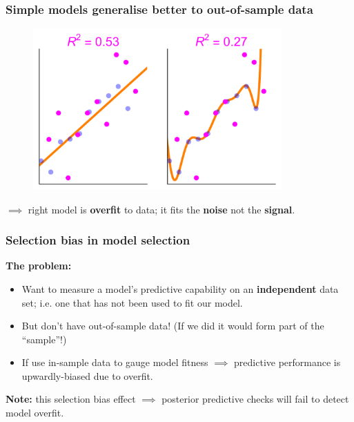 \documentclass[handout]{beamer}
\begin{document}
\begin{frame}
	\frametitle{Simple models generalise better to out-of-sample data}

	\begin{figure}[ht]
	\centerline{\includegraphics[width=0.85\textwidth]{figures/lec7_modelFitTest1.pdf}}
\end{figure}

$\implies$ right model is \textbf{overfit} to data; it fits the \textbf{noise} not the \textbf{signal}.
	
\end{frame}

\begin{frame}
	\frametitle{Selection bias in model selection}
	
	 \textbf{The problem:}
	\begin{itemize}
		\item<3-> Want to measure a model's predictive capability on an \textbf{independent} data set; i.e. one that has not been used to fit our model.
		\item<4-> But don't have out-of-sample data! (If we did it would form part of the ``sample''!)
		\item<5-> If use in-sample data to gauge model fitness $\implies$ predictive performance is upwardly-biased due to overfit.
	\end{itemize}
	
	\textbf{Note:} this selection bias effect $\implies$ posterior predictive checks will fail to detect model overfit.
	
\end{frame}
\end{document}

